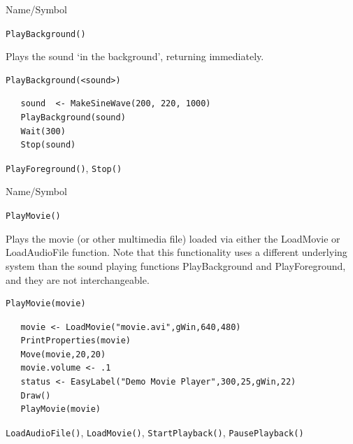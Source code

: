 \begin{desc}{Name/Symbol}
\item[Name/Symbol]	\verb+PlayBackground()+
 
\item[Description]	Plays the sound `in the background', returning immediately.

\item[Usage]		
\begin{verbatim}
PlayBackground(<sound>)
\end{verbatim}

\item[Example]	
\begin{verbatim}
   sound  <- MakeSineWave(200, 220, 1000)
   PlayBackground(sound)
   Wait(300)
   Stop(sound)
\end{verbatim}

\item[See Also]	\verb+PlayForeground()+, \verb+Stop()+
\end{desc}


\begin{desc}{Name/Symbol}
\item[Name/Symbol]	\verb+PlayMovie()+
 
\item[Description]	Plays the movie (or other multimedia file) loaded via
either the LoadMovie or LoadAudioFile function.  Note that this functionality uses a 
different underlying system than the sound playing functions PlayBackground and PlayForeground,
and they are not interchangeable.

\item[Usage]		
\begin{verbatim}
PlayMovie(movie)
\end{verbatim}

\item[Example]	
\begin{verbatim}
   movie <- LoadMovie("movie.avi",gWin,640,480)
   PrintProperties(movie)
   Move(movie,20,20)
   movie.volume <- .1
   status <- EasyLabel("Demo Movie Player",300,25,gWin,22)    
   Draw()
   PlayMovie(movie)
\end{verbatim}

\item[See Also] \verb+LoadAudioFile()+, \verb+LoadMovie()+, \verb+StartPlayback()+, \verb+PausePlayback()+
\end{desc}




